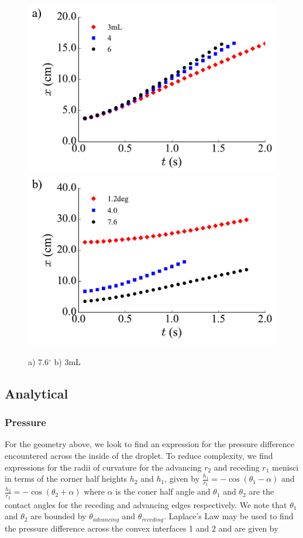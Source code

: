 \documentclass{article}
\begin{document}
\begin{figure}[h]
	
	\includegraphics[scale=0.5]{Figures/VaryingVolume}
	\includegraphics[scale=0.5]{Figures/VaryingAngle}
	\caption{a) 7.6$^\circ$ b) 3mL}
	\label{fig:Plot1}
\end{figure}

\subsection*{Analytical}
\subsubsection*{Pressure}

For the geometry above, we look to find an expression for the pressure difference encountered across the inside of the droplet. To reduce complexity, we find expressions for the radii of curvature for the advancing $r_2$ and receding $r_1$ menisci in terms of the corner half heights $h_2$ and $h_1$, given by
$
\frac{h_1}{r_1} = - \cos(\theta_1 - \alpha)
$
and 
$
\frac{h_2}{r_2} = -\cos(\theta_2 + \alpha)
$
where $\alpha$ is the coner half angle and $\theta_1$ and $\theta_2$ are the contact angles for the receding and advancing edges respectively. We note that $\theta_1$ and $\theta_2$ are bounded by $\theta_{advancing}$ and $\theta_{receding}$. Laplace's Law may be used to find the pressure difference across the convex interfaces 1 and 2 and are given by 
\end{document}
